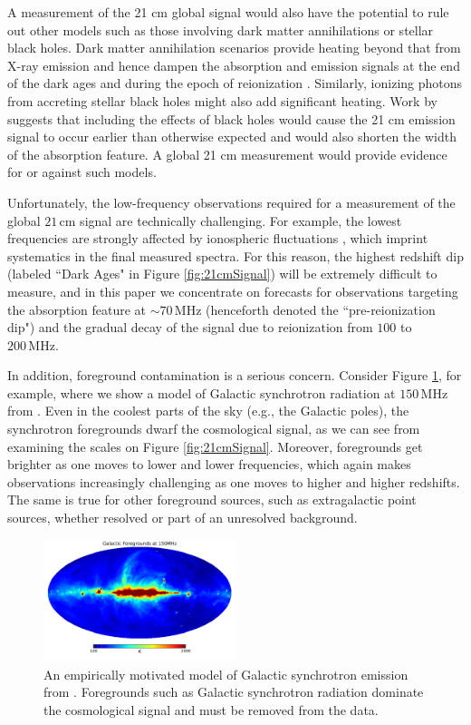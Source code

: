 \documentclass[twocolumn,apj,numberedappendix]{emulateapj}
\begin{document}
A measurement of the 21 cm global signal would also have the potential to rule out other models such as those involving dark matter annihilations or stellar black holes. Dark matter annihilation scenarios provide heating beyond that from X-ray emission and hence dampen the absorption and emission signals at the end of the dark ages and during the epoch of reionization \citep{Valdes2013_DM,Evoli2014}. Similarly, ionizing photons from accreting stellar black holes might also add significant heating. Work by \citet{Mirabel_stellar_bh} suggests that including the effects of black holes would cause the 21 cm emission signal to occur earlier than otherwise expected and would also shorten the width of the absorption feature. A global 21 cm measurement would provide evidence for or against such models.

Unfortunately, the low-frequency observations required for a measurement of the global $21\,\textrm{cm}$ signal are technically challenging. For example, the lowest frequencies are strongly affected by ionospheric fluctuations \citep{VedanthamIonosphere,DattaIonosphere,Rogers_etal_Ionosphere}, which imprint systematics in the final measured spectra. For this reason, the 
highest redshift dip (labeled ``Dark Ages" in Figure \ref{fig:21cmSignal}) will be extremely difficult to measure, and in this paper we concentrate on forecasts for observations targeting the absorption feature at $\sim 70 \,\textrm{MHz}$ (henceforth denoted the ``pre-reionization dip") and the gradual decay of the signal due to reionization from $100$ to $200\,\textrm{MHz}$.

In addition, foreground contamination is a serious concern. Consider Figure \ref{fig:GSM}, for example, where we show a model of Galactic synchrotron radiation at $150\,\textrm{MHz}$ from \citet{angelicaGSM}. Even in the coolest parts of the sky (e.g., the Galactic poles), the synchrotron foregrounds dwarf the cosmological signal, as we can see from examining the scales on Figure \ref{fig:21cmSignal}. Moreover, foregrounds get brighter as one moves to lower and lower frequencies, which again makes observations increasingly challenging as one moves to higher and higher redshifts. The same is true for other foreground sources, such as extragalactic point sources, whether resolved or part of an unresolved background.

\begin{figure}[!]
	\centering
	\includegraphics[width=0.5\textwidth] {figures/Haslam_150MHz.pdf}
	\caption{An empirically motivated model of Galactic synchrotron emission from \citet{angelicaGSM}. Foregrounds such as Galactic synchrotron radiation dominate the cosmological signal and must be removed from the data.}
	\label{fig:GSM}
\end{figure}
\end{document}
